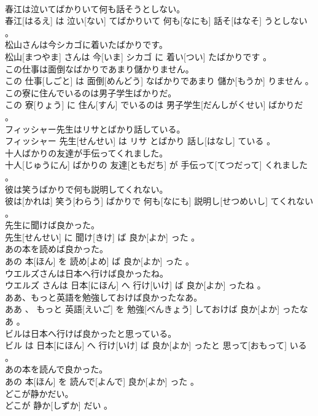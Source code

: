 \documentclass[8pt]{extreport}
\begin{document}
\begin{CJK}{UTF8}{min}
\\	春江は泣いてばかりいて何も話そうとしない。	
\\	春江[はるえ] は 泣い[ない] てばかりいて 何も[なにも] 話そ[はなそ] うとしない 。
\\	松山さんは今シカゴに着いたばかりです。	
\\	松山[まつやま] さんは 今[いま] シカゴ に 着い[つい] たばかりです 。
\\	この仕事は面倒なばかりであまり儲かりません。	
\\	この 仕事[しごと] は 面倒[めんどう] なばかりであまり 儲か[もうか] りません 。
\\	この寮に住んでいるのは男子学生ばかりだ。	
\\	この 寮[りょう] に 住ん[すん] でいるのは 男子学生[だんしがくせい] ばかりだ 。
\\	フィッシャー先生はリサとばかり話している。	
\\	フィッシャー 先生[せんせい] は リサ とばかり 話し[はなし] ている 。
\\	十人ばかりの友達が手伝ってくれました。	
\\	十人[じゅうにん] ばかりの 友達[ともだち] が 手伝って[てつだって] くれました 。
\\	彼は笑うばかりで何も説明してくれない。	
\\	彼は[かれは] 笑う[わらう] ばかりで 何も[なにも] 説明し[せつめいし] てくれない 。
\\	先生に聞けば良かった。	
\\	先生[せんせい] に 聞け[きけ] ば 良か[よか] った 。
\\	あの本を読めば良かった。	
\\	あの 本[ほん] を 読め[よめ] ば 良か[よか] った 。
\\	ウエルズさんは日本へ行けば良かったね。	
\\	ウエルズ さんは 日本[にほん] へ 行け[いけ] ば 良か[よか] ったね 。
\\	ああ、もっと英語を勉強しておけば良かったなあ。	
\\	ああ 、 もっと 英語[えいご] を 勉強[べんきょう] しておけば 良か[よか] ったなあ 。
\\	ビルは日本へ行けば良かったと思っている。	
\\	ビル は 日本[にほん] へ 行け[いけ] ば 良か[よか] ったと 思って[おもって] いる 。
\\	あの本を読んで良かった。	
\\	あの 本[ほん] を 読んで[よんで] 良か[よか] った 。
\\	どこが静かだい。	
\\	どこが 静か[しずか] だい 。

\end{CJK}
\end{document}
